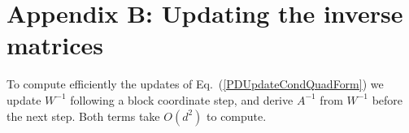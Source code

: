 \documentclass{article} %
\newcommand\mat[1]{{#1}}
\renewcommand\vec[1]{\mathbf{#1}}
\newcommand{\T}{{}^\mathsf{T}}
\newcommand{\W}{\mat{W}}
\newcommand{\ignore}[1]{}
\newcommand{\invA}{A^{-1}}
\renewcommand{\eqref}[1]{Eq.~(\ref{#1})}
\begin{document}
\ignore{
When using the hinge loss \eqref{hingelt}, the loss in \eqref{dlossranking} is not differentiable at $\lambda_{W}^t = 0$, but it has a sub gradient matrix
\begin{equation}
\frac{\partial {l_t (\W)}}{\partial \W} = \tfrac{1}{2}[\vec{q}_{t}\Delta\vec{p}_{t}\T  + \Delta\vec{p}_{t}\vec{q}_{t}\T] \cdot \textbf{1}(\lambda_{W}^t),
\end{equation}
where $\textbf{1}(x)$ is an indicator for $x>0$. This gradient is non-zero when the hinge loss \eqref{hingelt} is positive and vanishes otherwise. %
The matrix gradient of $\tfrac{1}{2} \| \W \|_{F}^{2}$ equals $\W$ and the matrix gradient of $\log \det(\W)$ equals $\W^{-1}$, yielding 
\begin{multline}
\frac{\partial {L (\W)}}{\partial \W} = 
\sum\limits_{t\in T}{\{ [\tfrac{1}{2}[\vec{q}_{t}\Delta\vec{p}_{t}\T + \Delta\vec{p}_{t}\vec{q}_{t}\T \} } \cdot \textbf{1}(\lambda_{W}^t)] \\- \alpha \cdot \W^{-1} + \beta \cdot \W 
\label{gradMat}
\end{multline}
}

\section*{Appendix B: Updating the inverse matrices}
\label{appendix-inverse}

To compute efficiently the updates of \eqref{PDUpdateCondQuadForm} we update $\W^{-1}$ following a block coordinate step, and derive $\invA$ from $\W^{-1}$ before the next step. Both terms take $O(d^2)$ to compute.
\end{document}
